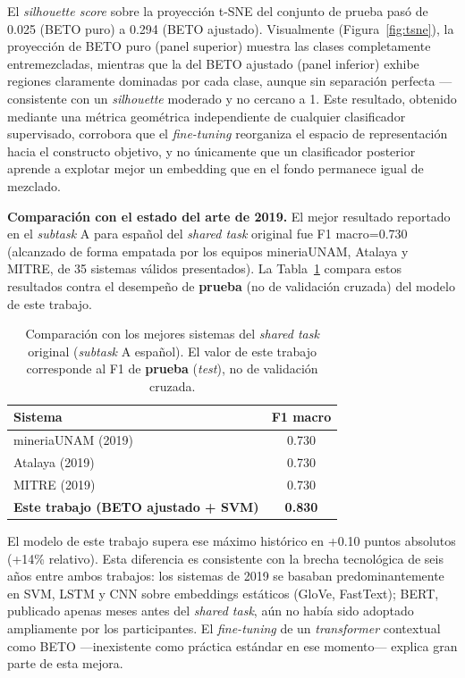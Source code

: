 \documentclass[conference]{IEEEtran}
\begin{document}
El \textit{silhouette score} sobre la proyección t-SNE del conjunto de prueba pasó de 0.025 (BETO puro) a 0.294 (BETO ajustado). Visualmente (Figura~\ref{fig:tsne}), la proyección de BETO puro (panel superior) muestra las clases completamente entremezcladas, mientras que la del BETO ajustado (panel inferior) exhibe regiones claramente dominadas por cada clase, aunque sin separación perfecta —consistente con un \textit{silhouette} moderado y no cercano a 1. Este resultado, obtenido mediante una métrica geométrica independiente de cualquier clasificador supervisado, corrobora que el \textit{fine-tuning} reorganiza el espacio de representación hacia el constructo objetivo, y no únicamente que un clasificador posterior aprende a explotar mejor un embedding que en el fondo permanece igual de mezclado.

\textbf{Comparación con el estado del arte de 2019.} El mejor resultado reportado en el \textit{subtask} A para español del \textit{shared task} original \cite{basile2019hateval} fue F1 macro=0.730 (alcanzado de forma empatada por los equipos mineriaUNAM, Atalaya y MITRE, de 35 sistemas válidos presentados). La Tabla~\ref{tab:sota} compara estos resultados contra el desempeño de \textbf{prueba} (no de validación cruzada) del modelo de este trabajo.

\begin{table}[h]
\centering
\small
\begin{tabular}{lc}
\toprule
\textbf{Sistema} & \textbf{F1 macro} \\
\midrule
mineriaUNAM (2019) & 0.730 \\
Atalaya (2019) & 0.730 \\
MITRE (2019) & 0.730 \\
\textbf{Este trabajo (BETO ajustado + SVM)} & \textbf{0.830} \\
\bottomrule
\end{tabular}
\caption{Comparación con los mejores sistemas del \textit{shared task} original (\textit{subtask} A español). El valor de este trabajo corresponde al F1 de \textbf{prueba} (\textit{test}), no de validación cruzada.}
\label{tab:sota}
\end{table}

El modelo de este trabajo supera ese máximo histórico en +0.10 puntos absolutos (+14\% relativo). Esta diferencia es consistente con la brecha tecnológica de seis años entre ambos trabajos: los sistemas de 2019 se basaban predominantemente en SVM, LSTM y CNN sobre embeddings estáticos (GloVe, FastText); BERT, publicado apenas meses antes del \textit{shared task}, aún no había sido adoptado ampliamente por los participantes. El \textit{fine-tuning} de un \textit{transformer} contextual como BETO —inexistente como práctica estándar en ese momento— explica gran parte de esta mejora.
\end{document}
